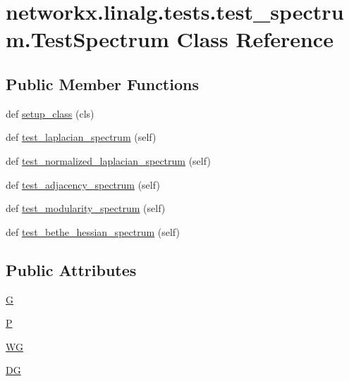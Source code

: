 \hypertarget{classnetworkx_1_1linalg_1_1tests_1_1test__spectrum_1_1TestSpectrum}{}\section{networkx.\+linalg.\+tests.\+test\+\_\+spectrum.\+Test\+Spectrum Class Reference}
\label{classnetworkx_1_1linalg_1_1tests_1_1test__spectrum_1_1TestSpectrum}
\subsection*{Public Member Functions}
\begin{DoxyCompactItemize}
\item 
def \hyperlink{classnetworkx_1_1linalg_1_1tests_1_1test__spectrum_1_1TestSpectrum_af29c3588e6d0ccd2775cea953773bf8c}{setup\+\_\+class} (cls)
\item 
def \hyperlink{classnetworkx_1_1linalg_1_1tests_1_1test__spectrum_1_1TestSpectrum_ab79229ef0a30870e36c3d29ee23637ad}{test\+\_\+laplacian\+\_\+spectrum} (self)
\item 
def \hyperlink{classnetworkx_1_1linalg_1_1tests_1_1test__spectrum_1_1TestSpectrum_a799b8a6e7f9abf8ef66951732a7da72a}{test\+\_\+normalized\+\_\+laplacian\+\_\+spectrum} (self)
\item 
def \hyperlink{classnetworkx_1_1linalg_1_1tests_1_1test__spectrum_1_1TestSpectrum_a6a6a00f8460a967c29bd6ba709dc6e02}{test\+\_\+adjacency\+\_\+spectrum} (self)
\item 
def \hyperlink{classnetworkx_1_1linalg_1_1tests_1_1test__spectrum_1_1TestSpectrum_aeaec47c66b7e89c0f092b6cfddec589c}{test\+\_\+modularity\+\_\+spectrum} (self)
\item 
def \hyperlink{classnetworkx_1_1linalg_1_1tests_1_1test__spectrum_1_1TestSpectrum_aec01b8cd876090a0899a338a91815195}{test\+\_\+bethe\+\_\+hessian\+\_\+spectrum} (self)
\end{DoxyCompactItemize}
\subsection*{Public Attributes}
\begin{DoxyCompactItemize}
\item 
\hyperlink{classnetworkx_1_1linalg_1_1tests_1_1test__spectrum_1_1TestSpectrum_acda66e0eb3d009cbfef59f51bd588c45}{G}
\item 
\hyperlink{classnetworkx_1_1linalg_1_1tests_1_1test__spectrum_1_1TestSpectrum_a92ef4290cd11f0b32dd96ab232d20dfe}{P}
\item 
\hyperlink{classnetworkx_1_1linalg_1_1tests_1_1test__spectrum_1_1TestSpectrum_afcabc5391e19aa5b51ce020ce5ee5c28}{WG}
\item 
\hyperlink{classnetworkx_1_1linalg_1_1tests_1_1test__spectrum_1_1TestSpectrum_ae1fd65c0865ca34210413f52c8ea8da9}{DG}
\end{DoxyCompactItemize}


